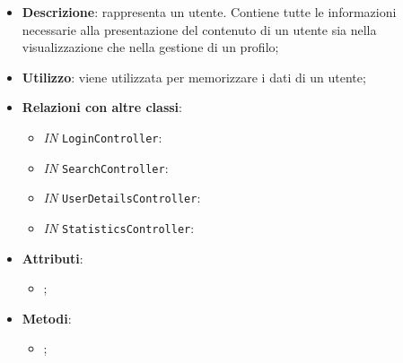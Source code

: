 		\begin{itemize}
			\item \textbf{Descrizione}: rappresenta un utente. Contiene tutte le informazioni necessarie alla
			presentazione del contenuto di un utente sia nella visualizzazione che nella gestione di un profilo;
			\item \textbf{Utilizzo}: viene utilizzata per memorizzare i dati di un utente;
			\item \textbf{Relazioni con altre classi}: 
			\begin{itemize}
				\item \textit{IN} \texttt{LoginController}: 
				\item \textit{IN} \texttt{SearchController}:
				\item \textit{IN} \texttt{UserDetailsController}:
				\item \textit{IN} \texttt{StatisticsController}:
			\end{itemize}
			\item \textbf{Attributi}: 
			\begin{itemize}
				\item ;
			\end{itemize}
			\item \textbf{Metodi}: 
			\begin{itemize}
				\item ;
			\end{itemize}
		\end{itemize}													